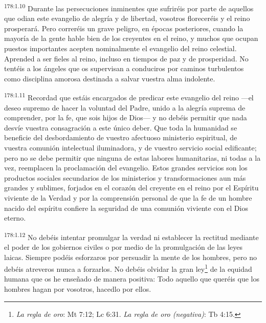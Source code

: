 \par
\textsuperscript{178:1.10} Durante las persecuciones inminentes que sufriréis por parte de aquellos que odian este evangelio de alegría y de libertad, vosotros floreceréis y el reino prosperará. Pero correréis un grave peligro, en épocas posteriores, cuando la mayoría de la gente hable bien de los creyentes en el reino, y muchos que ocupan puestos importantes acepten nominalmente el evangelio del reino celestial. Aprended a ser fieles al reino, incluso en tiempos de paz y de prosperidad. No tentéis a los ángeles que os supervisan a conduciros por caminos turbulentos como disciplina amorosa destinada a salvar vuestra alma indolente.

\par
\textsuperscript{178:1.11} Recordad que estáis encargados de predicar este evangelio del reino ---el deseo supremo de hacer la voluntad del Padre, unido a la alegría suprema de comprender, por la fe, que sois hijos de Dios--- y no debéis permitir que nada desvíe vuestra consagración a este único deber. Que toda la humanidad se beneficie del desbordamiento de vuestro afectuoso ministerio espiritual, de vuestra comunión intelectual iluminadora, y de vuestro servicio social edificante; pero no se debe permitir que ninguna de estas labores humanitarias, ni todas a la vez, reemplacen la proclamación del evangelio. Estos grandes servicios son los productos sociales secundarios de los ministerios y transformaciones aun más grandes y sublimes, forjados en el corazón del creyente en el reino por el Espíritu viviente de la Verdad y por la comprensión personal de que la fe de un hombre nacido del espíritu confiere la seguridad de una comunión viviente con el Dios eterno.

\par
\textsuperscript{178:1.12} No debéis intentar promulgar la verdad ni establecer la rectitud mediante el poder de los gobiernos civiles o por medio de la promulgación de las leyes laicas. Siempre podéis esforzaros por persuadir la mente de los hombres, pero no debéis atreveros nunca a forzarlos. No debéis olvidar la gran ley\footnote{\textit{La regla de oro}: Mt 7:12; Lc 6:31. \textit{La regla de oro (negativa)}: Tb 4:15.} de la equidad humana que os he enseñado de manera positiva: Todo aquello que queréis que los hombres hagan por vosotros, hacedlo por ellos.

